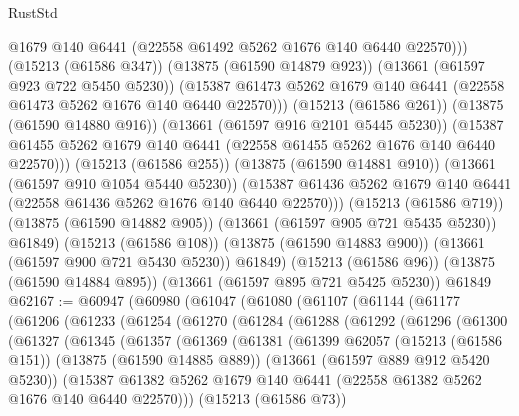 \begin{lexlean}{RustStd}
\begin{coremodule}
                  @1679
                  @140
                  @6441
                  (@22558 @61492 @5262 @1676 @140 @6440 @22570)))
              (@15213 (@61586 @347))
              (@13875 (@61590 @14879 @923))
              (@13661 (@61597 @923 @722 @5450 @5230))
              (@15387 @61473 @5262 @1679 @140 @6441 (@22558 @61473 @5262 @1676 @140 @6440 @22570)))
            (@15213 (@61586 @261))
            (@13875 (@61590 @14880 @916))
            (@13661 (@61597 @916 @2101 @5445 @5230))
            (@15387 @61455 @5262 @1679 @140 @6441 (@22558 @61455 @5262 @1676 @140 @6440 @22570)))
          (@15213 (@61586 @255))
          (@13875 (@61590 @14881 @910))
          (@13661 (@61597 @910 @1054 @5440 @5230))
          (@15387 @61436 @5262 @1679 @140 @6441 (@22558 @61436 @5262 @1676 @140 @6440 @22570)))
        (@15213 (@61586 @719))
        (@13875 (@61590 @14882 @905))
        (@13661 (@61597 @905 @721 @5435 @5230))
        @61849)
      (@15213 (@61586 @108))
      (@13875 (@61590 @14883 @900))
      (@13661 (@61597 @900 @721 @5430 @5230))
      @61849)
    (@15213 (@61586 @96))
    (@13875 (@61590 @14884 @895))
    (@13661 (@61597 @895 @721 @5425 @5230))
    @61849
@62167 := @60947
    (@60980
      (@61047
        (@61080
          (@61107
            (@61144
              (@61177
                (@61206
                  (@61233
                    (@61254
                      (@61270
                        (@61284
                          (@61288
                            (@61292
                              (@61296
                                (@61300
                                  (@61327
                                    (@61345
                                      (@61357
                                        (@61369
                                          (@61381
                                            (@61399
                                              @62057
                                              (@15213 (@61586 @151))
                                              (@13875 (@61590 @14885 @889))
                                              (@13661 (@61597 @889 @912 @5420 @5230))
                                              (@15387
                                                @61382
                                                @5262
                                                @1679
                                                @140
                                                @6441
                                                (@22558 @61382 @5262 @1676 @140 @6440 @22570)))
                                            (@15213 (@61586 @73))

\end{coremodule}
\end{lexlean}
